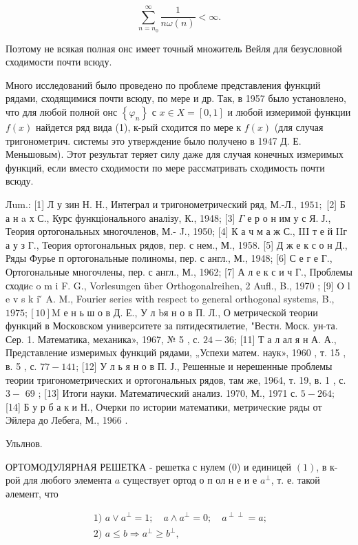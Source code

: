 \documentclass[10pt]{article}
\begin{document}
\[
\sum_{n=n_{0}}^{\infty} \frac{1}{n \omega(n)}<\infty .
\]

Поэтому не всякая полная онс имеет точный множитель Вейля для безусловной сходимости почти всюду.

Много исследований было проведено по проблеме представления функций рядами, сходящимися почти всюду, по мере и др. Так, в 1957 было установлено, что для любой полной онс $\left\{\varphi_{n}\right\}$ с $x \in X=[0,1]$ и любой измеримой функции $f(x)$ найдется ряд вида (1), к-рый сходится по мере к $f(x)$ (для случая тригонометрич. системы это утверждение было получено в 1947 Д. Е. Меньшовым). Этот результат теряет силу даже для случая конечных измеримых функций, если вместо сходимости по мере рассматривать сходимость почти всюду.

Лum.: [1] Л у зин Н. Н., Интеграл и тригонометрический ряд, М.-Л., $1951 ;$ [2] Б а н a х С., Курс функціонального аналізу, К., 1948; [3] $\Gamma$ е р о н им у с Я. Ј., Теория ортогональных многочленов, М.- J., 1950; [4] К а ч м а ж С., III т е й IIг а у з Г., Теория ортогональных рядов, пер. с нем., М., 1958. [5] Д ж е к с о н Д., Ряды Фурье п ортогональные полиномы, пер. с англ., М., 1948; [6] С е г е Г., Ортогональные многочлены, пер. с англ., М., 1962; [7] А л е к с и ч Г., Проблемы сходиc o m i F. G., Vorlesungen über Orthogonalreihen, 2 Aufl., B., 1970 ; [9] O l e v s k i ̌ A. M., Fourier series with respect to general orthogonal systems, B., $1975 ;[10] \mathrm{M}$ е н ь ш о в Д. Е., У л bя н о в П. Л., О метрической теории функций в Московском университете за пятидесятилетие, "Вестн. Моск. ун-та. Сер. 1. Математика, механика», 1967, № 5 , с. $24-36$; [11] Т а л ал я н А. А., Представление измеримых функций рядами, „Успехи матем. наук», 1960 , т. 15 , в. 5 , с. $77-141$; [12] У л ь я н о в П. Ј., Решенные и нерешенные проблемы теории тригонометрических и ортогональных рядов, там же, 1964, т. 19, в. 1 , с. $3-$ 69 ; [13] Итоги науки. Математический анализ. 1970, М., 1971 с. $5-264 ;$ [14] Б у р б а к и Н., Очерки по истории математики, метрические ряды от Эйлера до Лебега, М., 1966 .

Ульлнов.

ОРТОМОДУЛЯРНАЯ РЕШЕТКА - решетка с нулем (0) и единицей $(1)$, в к-рой для любого элемента $a$ существует ортод о п ол н е и е $a^{\perp}$, т. е. такой әлемент, что

\[
\begin{gathered}
\text { 1) } a \vee a^{\perp}=1 ; \quad a \wedge a^{\perp}=0 ; \quad a^{\perp \perp}=a ; \\
\text { 2) } a \leqslant b \Rightarrow a^{\perp} \geqslant b^{\perp},
\end{gathered}
\]
\end{document}
